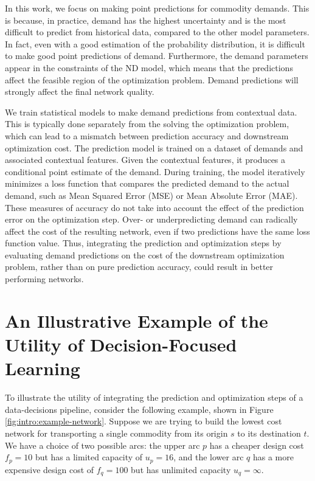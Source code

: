 In this work, we focus on making point predictions for commodity demands. This is because, in practice, demand has the highest uncertainty and is the most difficult to predict from historical data, compared to the other model parameters. In fact, even with a good estimation of the probability distribution, it is difficult to make good point predictions of demand. Furthermore, the demand parameters appear in the constraints of the ND model, which means that the predictions affect the feasible region of the optimization problem. Demand predictions will strongly affect the final network quality.  

We train statistical models to make demand predictions from contextual data. This is typically done separately from the solving the optimization problem, which can lead to a mismatch between prediction accuracy and downstream optimization cost. The prediction model is trained on a dataset of demands and associated contextual features. Given the contextual features, it produces a conditional point estimate of the demand. During training, the model iteratively minimizes a loss function that compares the predicted demand to the actual demand, such as Mean Squared Error (MSE) or Mean Absolute Error (MAE). These measures of accuracy do not take into account the effect of the prediction error on the optimization step. Over- or underpredicting demand can radically affect the cost of the resulting network, even if two predictions have the same loss function value. Thus, integrating the prediction and optimization steps by evaluating demand predictions on the cost of the downstream optimization problem, rather than on pure prediction accuracy, could result in better performing networks.

\section{An Illustrative Example of the Utility of Decision-Focused Learning}

To illustrate the utility of integrating the prediction and optimization steps of a data-decisions pipeline, consider the following example, shown in Figure \ref{fig:intro:example-network}. Suppose we are trying to build the lowest cost network for transporting a single commodity from its origin $s$ to its destination $t$. We have a choice of two possible arcs: the upper arc $p$ has a cheaper design cost $f_p = 10$ but has a limited capacity of $u_p = 16$, and the lower arc $q$ has a more expensive design cost of $f_q = 100$ but has unlimited capacity $u_q = \infty$. 

